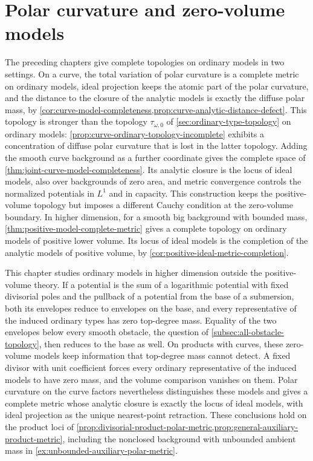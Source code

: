 \chapter{Polar curvature and zero-volume models}
\label{chap:polar-model-topologies}

The preceding chapters give complete topologies on ordinary models in two settings. On a curve, the total variation of polar curvature is a complete metric on ordinary models, ideal projection keeps the atomic part of the polar curvature, and the distance to the closure of the analytic models is exactly the diffuse polar mass, by \cref{cor:curve-model-completeness,prop:curve-analytic-distance-defect}. This topology is stronger than the topology $\tau_{\omega,0}$ of \cref{sec:ordinary-type-topology} on ordinary models: \cref{prop:curve-ordinary-topology-incomplete} exhibits a concentration of diffuse polar curvature that is lost in the latter topology. Adding the smooth curve background as a further coordinate gives the complete space of \cref{thm:joint-curve-model-completeness}. Its analytic closure is the locus of ideal models, also over backgrounds of zero area, and metric convergence controls the normalized potentials in $L^1$ and in capacity. This construction keeps the positive-volume topology but imposes a different Cauchy condition at the zero-volume boundary. In higher dimension, for a smooth big background with bounded mass, \cref{thm:positive-model-complete-metric} gives a complete topology on ordinary models of positive lower volume. Its locus of ideal models is the completion of the analytic models of positive volume, by \cref{cor:positive-ideal-metric-completion}.

This chapter studies ordinary models in higher dimension outside the positive-volume theory. If a potential is the sum of a logarithmic potential with fixed divisorial poles and the pullback of a potential from the base of a submersion, both its envelopes reduce to envelopes on the base, and every representative of the induced ordinary types has zero top-degree mass. Equality of the two envelopes below every smooth obstacle, the question of \cref{subsec:all-obstacle-topology}, then reduces to the base as well. On products with curves, these zero-volume models keep information that top-degree mass cannot detect. A fixed divisor with unit coefficient forces every ordinary representative of the induced models to have zero mass, and the volume comparison vanishes on them. Polar curvature on the curve factors nevertheless distinguishes these models and gives a complete metric whose analytic closure is exactly the locus of ideal models, with ideal projection as the unique nearest-point retraction. These conclusions hold on the product loci of \cref{prop:divisorial-product-polar-metric,prop:general-auxiliary-product-metric}, including the nonclosed background with unbounded ambient mass in \cref{ex:unbounded-auxiliary-polar-metric}.


